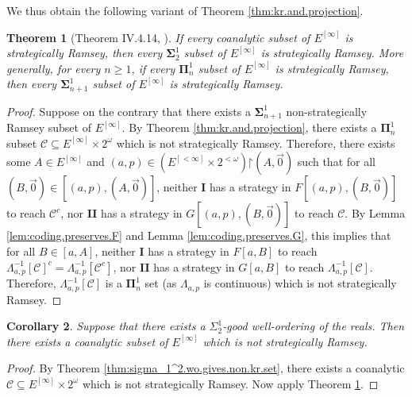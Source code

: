 \documentclass[11pt,reqno]{amsart}
\theoremstyle{plain}
\numberwithin{equation}{section}
\newtheorem{theorem}{Theorem}[section]
\newtheorem{corollary}[theorem]{Corollary}
\theoremstyle{definition}
\newcommand{\cal}{\mathcal}
\newcommand{\restrictedto}{\mathord{\upharpoonright}}
\begin{document}
We thus obtain the following variant of Theorem \ref{thm:kr.and.projection}.

\begin{theorem}[Theorem IV.4.14, \cite{AT05}]
\label{thm:sr.and.projections}
    If every coanalytic subset of $E^{[\infty]}$ is strategically Ramsey, then every $\mathbf{\Sigma}_2^1$ subset of $E^{[\infty]}$ is strategically Ramsey. More generally, for every $n \geq 1$, if every $\mathbf{\Pi}_n^1$ subset of $E^{[\infty]}$ is strategically Ramsey, then every $\mathbf{\Sigma}_{n+1}^1$ subset of $E^{[\infty]}$ is strategically Ramsey.
\end{theorem}

\begin{proof}
    Suppose on the contrary that there exists a $\mathbf{\Sigma}_{n+1}^1$ non-strategically Ramsey subset of $E^{[\infty]}$. By Theorem \ref{thm:kr.and.projection}, there exists a $\mathbf{\Pi}_n^1$ subset $\cal{C} \subseteq E^{[\infty]} \times 2^\omega$ which is not strategically Ramsey. Therefore, there exists some $A \in E^{[\infty]}$ and $(a,p) \in (E^{[<\infty]} \times 2^{<\omega})\restrictedto(A,\vec{0})$ such that for all $(B,\vec{0}) \in [(a,p),(A,\vec{0})]$, neither \textbf{I} has a strategy in $F[(a,p),(B,\vec{0})]$ to reach $\cal{C}^c$, nor \textbf{II} has a strategy in $G[(a,p),(B,\vec{0})]$ to reach $\cal{C}$. By Lemma \ref{lem:coding.preserves.F} and Lemma \ref{lem:coding.preserves.G}, this implies that for all $B \in [a,A]$, neither \textbf{I} has a strategy in $F[a,B]$ to reach $\Lambda_{a,p}^{-1}[\cal{C}]^c = \Lambda_{a,p}^{-1}[\cal{C}^c]$, nor \textbf{II} has a strategy in $G[a,B]$ to reach $\Lambda_{a,p}^{-1}[\cal{C}]$. Therefore, $\Lambda_{a,p}^{-1}[\cal{C}]$ is a $\mathbf{\Pi}_n^1$ set (as $\Lambda_{a,p}$ is continuous) which is not strategically Ramsey.
\end{proof}

\begin{corollary}
    Suppose that there exists a $\Sigma_2^1$-good well-ordering of the reals. Then there exists a coanalytic subset of $E^{[\infty]}$ which is not strategically Ramsey.
\end{corollary}

\begin{proof}
    By Theorem \ref{thm:sigma_1^2.wo.gives.non.kr.set}, there exists a coanalytic $\cal{C} \subseteq E^{[\infty]} \times 2^\omega$ which is not strategically Ramsey. Now apply Theorem \ref{thm:sr.and.projections}.
\end{proof}
\end{document}
